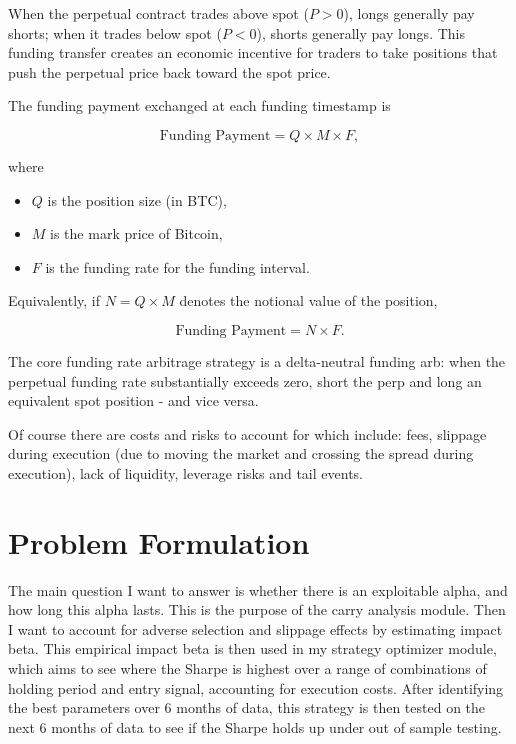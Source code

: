 \documentclass[11pt,a4paper]{article}
\begin{document}
When the perpetual contract trades above spot ($P > 0$), longs generally pay shorts; when it trades below spot ($P < 0$), shorts generally pay longs. This funding transfer creates an economic incentive for traders to take positions that push the perpetual price back toward the spot price.

The funding payment exchanged at each funding timestamp is

\[
\text{Funding Payment}
=
Q \times M \times F,
\]

where

\begin{itemize}
    \item $Q$ is the position size (in BTC),
    \item $M$ is the mark price of Bitcoin,
    \item $F$ is the funding rate for the funding interval.
\end{itemize}

Equivalently, if $N = Q \times M$ denotes the notional value of the position,

\[
\text{Funding Payment}
=
N \times F.
\]

The core funding rate arbitrage strategy is a delta-neutral funding arb: when the perpetual funding rate substantially exceeds zero, short the perp and long an equivalent spot
position - and vice versa.

Of course there are costs and risks to account for which include: fees, slippage during execution (due to moving the market and crossing the spread during execution), lack of liquidity, leverage risks and tail events.

\section{Problem Formulation}

The main question I want to answer is whether there is an exploitable alpha, and how long this alpha lasts. This is the purpose of the carry analysis module. Then I want to account for adverse selection and slippage effects by estimating impact beta. This empirical impact beta is then used in my strategy optimizer module, which aims to see where the Sharpe is highest over a range of combinations of holding period and entry signal, accounting for execution costs. After identifying the best parameters over 6 months of data, this strategy is then tested on the next 6 months of data to see if the Sharpe holds up under out of sample testing.
\end{document}
